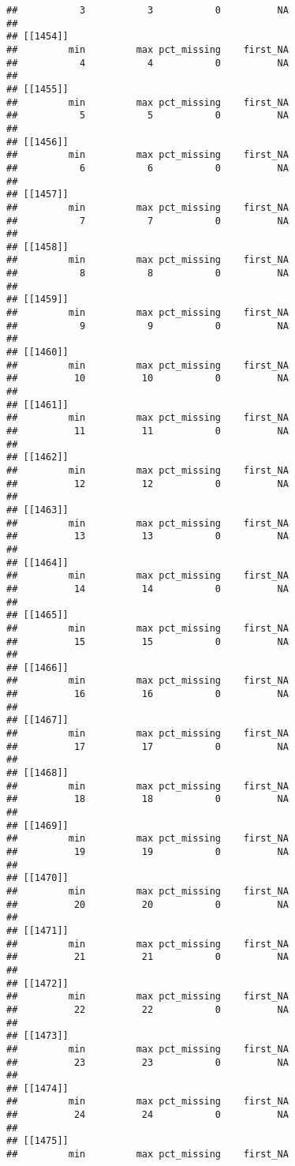 \documentclass[
]{article}
\begin{document}
\begin{verbatim}
##           3           3           0          NA 
## 
## [[1454]]
##         min         max pct_missing    first_NA 
##           4           4           0          NA 
## 
## [[1455]]
##         min         max pct_missing    first_NA 
##           5           5           0          NA 
## 
## [[1456]]
##         min         max pct_missing    first_NA 
##           6           6           0          NA 
## 
## [[1457]]
##         min         max pct_missing    first_NA 
##           7           7           0          NA 
## 
## [[1458]]
##         min         max pct_missing    first_NA 
##           8           8           0          NA 
## 
## [[1459]]
##         min         max pct_missing    first_NA 
##           9           9           0          NA 
## 
## [[1460]]
##         min         max pct_missing    first_NA 
##          10          10           0          NA 
## 
## [[1461]]
##         min         max pct_missing    first_NA 
##          11          11           0          NA 
## 
## [[1462]]
##         min         max pct_missing    first_NA 
##          12          12           0          NA 
## 
## [[1463]]
##         min         max pct_missing    first_NA 
##          13          13           0          NA 
## 
## [[1464]]
##         min         max pct_missing    first_NA 
##          14          14           0          NA 
## 
## [[1465]]
##         min         max pct_missing    first_NA 
##          15          15           0          NA 
## 
## [[1466]]
##         min         max pct_missing    first_NA 
##          16          16           0          NA 
## 
## [[1467]]
##         min         max pct_missing    first_NA 
##          17          17           0          NA 
## 
## [[1468]]
##         min         max pct_missing    first_NA 
##          18          18           0          NA 
## 
## [[1469]]
##         min         max pct_missing    first_NA 
##          19          19           0          NA 
## 
## [[1470]]
##         min         max pct_missing    first_NA 
##          20          20           0          NA 
## 
## [[1471]]
##         min         max pct_missing    first_NA 
##          21          21           0          NA 
## 
## [[1472]]
##         min         max pct_missing    first_NA 
##          22          22           0          NA 
## 
## [[1473]]
##         min         max pct_missing    first_NA 
##          23          23           0          NA 
## 
## [[1474]]
##         min         max pct_missing    first_NA 
##          24          24           0          NA 
## 
## [[1475]]
##         min         max pct_missing    first_NA 

\end{verbatim}
\end{document}
